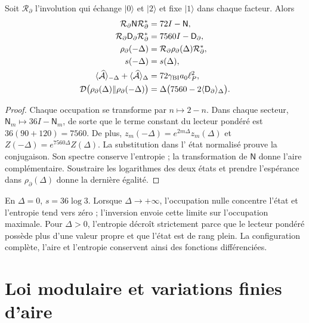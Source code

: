 \begin{theorem}
\label{x_reciprocidad:vii:thm:inversion-sectorial}
Soit \(\mathcal R_\partial\) l'involution qui échange
\(|0\rangle\) et \(|2\rangle\) et fixe \(|1\rangle\) dans chaque
facteur. Alors
\begin{align}
 \mathcal R_\partial\mathsf N\mathcal R_\partial^*&=72I-\mathsf N,\\
 \mathcal R_\partial\mathsf D_\partial\mathcal R_\partial^*
 &=7560I-\mathsf D_\partial,\\
 \rho_\partial(-\Delta)&=\mathcal R_\partial\rho_\partial(\Delta)
                          \mathcal R_\partial^*,\\
 s(-\Delta)&=s(\Delta),\\
 \langle\widehat{\mathcal A}\rangle_{-\Delta}
 +\langle\widehat{\mathcal A}\rangle_\Delta
 &=72\gamma_{\rm BI}a_0\ell_P^2,\\
 \mathcal D\bigl(\rho_\partial(\Delta)\Vert\rho_\partial(-\Delta)\bigr)
 &=\Delta\bigl(7560-2\langle\mathsf D_\partial\rangle_\Delta\bigr).
 \label{x_reciprocidad:vii:eq:inversion-sectorial}
\end{align}
\end{theorem}
\begin{proof}
Chaque occupation se transforme par \(n\mapsto2-n\). Dans chaque secteur,
\(\mathsf N_m\mapsto36I-\mathsf N_m\), de sorte que le terme
constant du lecteur pondéré est \(36(90+120)=7560\).
De plus, \(z_m(-\Delta)=e^{2m\Delta}z_m(\Delta)\) et
\(Z(-\Delta)=e^{7560\Delta}Z(\Delta)\). La substitution dans l'
état normalisé prouve la conjugaison. Son spectre conserve l'entropie ;
la transformation de \(\mathsf N\) donne l'aire complémentaire. Soustraire
les logarithmes des deux états et prendre l'espérance dans
\(\rho_\partial(\Delta)\) donne la dernière égalité.
\end{proof}

En \(\Delta=0\), \(s=36\log3\). Lorsque \(\Delta\to+\infty\),
l'occupation nulle concentre l'état et l'entropie tend vers zéro ;
l'inversion envoie cette limite sur l'occupation maximale. Pour \(\Delta>0\),
l'entropie décroît strictement parce que le lecteur pondéré possède plus
d'une valeur propre et que l'état est de rang plein. La configuration
complète, l'aire et l'entropie conservent ainsi des fonctions différenciées.

\section{Loi modulaire et variations finies d'aire}
\label{x_reciprocidad:vii:subsec:ley-modular-finita}

